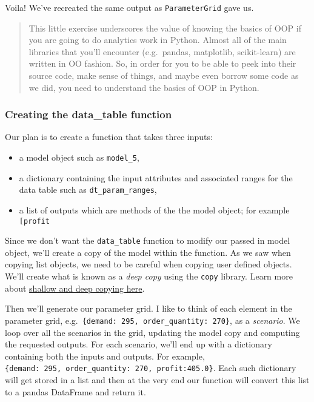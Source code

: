 \documentclass[11pt]{article}
\providecommand{\tightlist}{%
      \setlength{\itemsep}{0pt}\setlength{\parskip}{0pt}}
\begin{document}
    Voila! We've recreated the same output as \texttt{ParameterGrid} gave
us.

\begin{quote}
This little exercise underscores the value of knowing the basics of OOP
if you are going to do analytics work in Python. Almost all of the main
libraries that you'll encounter (e.g.~pandas, matplotlib, scikit-learn)
are written in OO fashion. So, in order for you to be able to peek into
their source code, make sense of things, and maybe even borrow some code
as we did, you need to understand the basics of OOP in Python.
\end{quote}

    \hypertarget{creating-the-data_table-function}{%
\subsubsection{Creating the data\_table
function}\label{creating-the-data_table-function}}

Our plan is to create a function that takes three inputs:

\begin{itemize}
\tightlist
\item
  a model object such as \texttt{model\_5},
\item
  a dictionary containing the input attributes and associated ranges for
  the data table such as \texttt{dt\_param\_ranges},
\item
  a list of outputs which are methods of the the model object; for
  example \texttt{{[}\textquotesingle{}profit\textquotesingle{}{]}}
\end{itemize}

Since we don't want the \texttt{data\_table} function to modify our
passed in model object, we'll create a copy of the model within the
function. As we saw when copying list objects, we need to be careful
when copying user defined objects. We'll create what is known as a
\emph{deep copy} using the \texttt{copy} library. Learn more about
\href{https://docs.python.org/3/library/copy.html}{shallow and deep
copying here}.

Then we'll generate our parameter grid. I like to think of each element
in the parameter grid,
e.g.~\texttt{\{\textquotesingle{}demand\textquotesingle{}:\ 295,\ \textquotesingle{}order\_quantity\textquotesingle{}:\ 270\}},
as a \emph{scenario}. We loop over all the scenarios in the grid,
updating the model copy and computing the requested outputs. For each
scenario, we'll end up with a dictionary containing both the inputs and
outputs. For example,
\texttt{\{\textquotesingle{}demand\textquotesingle{}:\ 295,\ \textquotesingle{}order\_quantity\textquotesingle{}:\ 270,\ \textquotesingle{}profit\textquotesingle{}:405.0\}}.
Each such dictionary will get stored in a list and then at the very end
our function will convert this list to a pandas DataFrame and return it.
\end{document}
